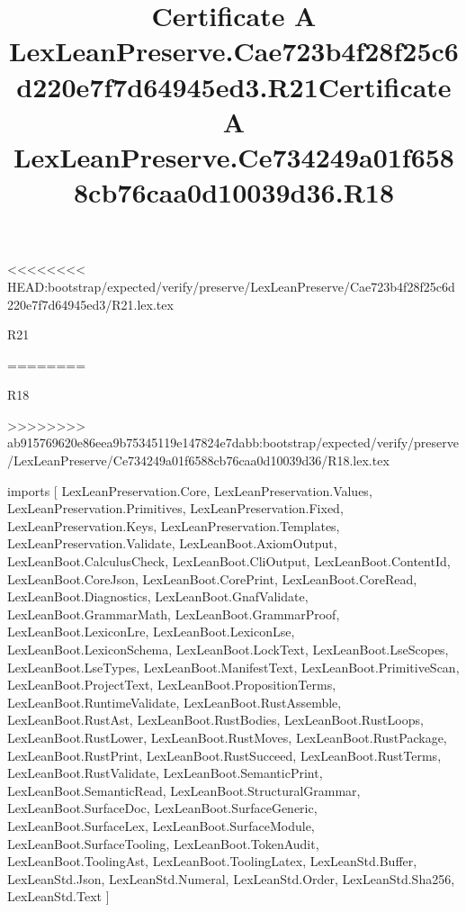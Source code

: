 <<<<<<<< HEAD:bootstrap/expected/verify/preserve/LexLeanPreserve/Cae723b4f28f25c6d220e7f7d64945ed3/R21.lex.tex
\begin{lexlean}{R21}
\title{Certificate A LexLeanPreserve.Cae723b4f28f25c6d220e7f7d64945ed3.R21}
========
\begin{lexlean}{R18}
\title{Certificate A LexLeanPreserve.Ce734249a01f6588cb76caa0d10039d36.R18}
>>>>>>>> ab915769620e86eea9b75345119e147824e7dabb:bootstrap/expected/verify/preserve/LexLeanPreserve/Ce734249a01f6588cb76caa0d10039d36/R18.lex.tex
\begin{coremodule}
imports [
  LexLeanPreservation.Core,
  LexLeanPreservation.Values,
  LexLeanPreservation.Primitives,
  LexLeanPreservation.Fixed,
  LexLeanPreservation.Keys,
  LexLeanPreservation.Templates,
  LexLeanPreservation.Validate,
  LexLeanBoot.AxiomOutput,
  LexLeanBoot.CalculusCheck,
  LexLeanBoot.CliOutput,
  LexLeanBoot.ContentId,
  LexLeanBoot.CoreJson,
  LexLeanBoot.CorePrint,
  LexLeanBoot.CoreRead,
  LexLeanBoot.Diagnostics,
  LexLeanBoot.GnafValidate,
  LexLeanBoot.GrammarMath,
  LexLeanBoot.GrammarProof,
  LexLeanBoot.LexiconLre,
  LexLeanBoot.LexiconLse,
  LexLeanBoot.LexiconSchema,
  LexLeanBoot.LockText,
  LexLeanBoot.LseScopes,
  LexLeanBoot.LseTypes,
  LexLeanBoot.ManifestText,
  LexLeanBoot.PrimitiveScan,
  LexLeanBoot.ProjectText,
  LexLeanBoot.PropositionTerms,
  LexLeanBoot.RuntimeValidate,
  LexLeanBoot.RustAssemble,
  LexLeanBoot.RustAst,
  LexLeanBoot.RustBodies,
  LexLeanBoot.RustLoops,
  LexLeanBoot.RustLower,
  LexLeanBoot.RustMoves,
  LexLeanBoot.RustPackage,
  LexLeanBoot.RustPrint,
  LexLeanBoot.RustSucceed,
  LexLeanBoot.RustTerms,
  LexLeanBoot.RustValidate,
  LexLeanBoot.SemanticPrint,
  LexLeanBoot.SemanticRead,
  LexLeanBoot.StructuralGrammar,
  LexLeanBoot.SurfaceDoc,
  LexLeanBoot.SurfaceGeneric,
  LexLeanBoot.SurfaceLex,
  LexLeanBoot.SurfaceModule,
  LexLeanBoot.SurfaceTooling,
  LexLeanBoot.TokenAudit,
  LexLeanBoot.ToolingAst,
  LexLeanBoot.ToolingLatex,
  LexLeanStd.Buffer,
  LexLeanStd.Json,
  LexLeanStd.Numeral,
  LexLeanStd.Order,
  LexLeanStd.Sha256,
  LexLeanStd.Text
]


\end{coremodule}
\end{lexlean}
\end{lexlean}
